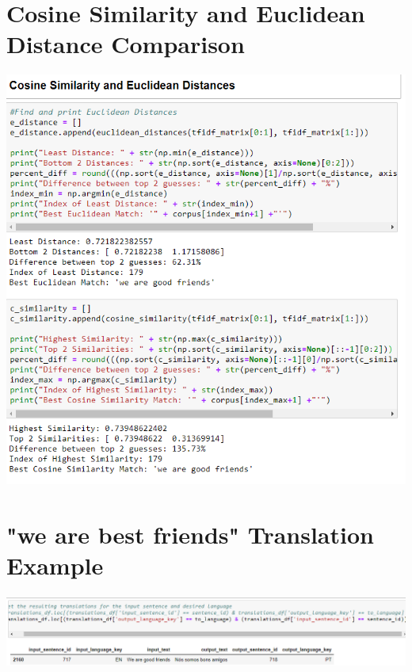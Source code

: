 \documentclass[runningheads]{llncs}
\begin{document}
\section{Cosine Similarity and Euclidean Distance Comparison}
\hypertarget{Appendix C}{}


	\begin{minipage}{\linewidth}
		\begin{center}
			\includegraphics[width=\linewidth]{Friends_Comparison.png}
			\label{fig:Sentence Comparison 1}
			\vspace*{1cm}
		\end{center}
	\end{minipage}
	\afterpage{\clearpage}


\section{"we are best friends" Translation Example}
\hypertarget{Appendix D}{}


	\begin{minipage}{\linewidth}
		\begin{center}
			\includegraphics[width=\linewidth]{Language_Match.png}
			\label{fig:Translating Matched Sentence  to Portuguese}
			\vspace*{1cm}
		\end{center}
	\end{minipage}
	\afterpage{\clearpage}
\end{document}
